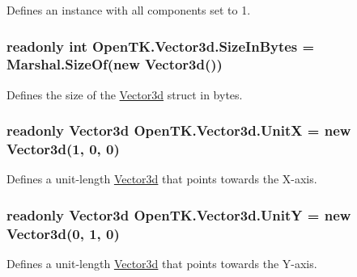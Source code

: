 Defines an instance with all components set to 1. 

\hypertarget{struct_open_t_k_1_1_vector3d_a5390299765c81e1b1f04850ee26c2a5e}{
\subsubsection[{Size\-In\-Bytes}]{\setlength{\rightskip}{0pt plus 5cm}readonly int Open\-T\-K.\-Vector3d.\-Size\-In\-Bytes = Marshal.\-Size\-Of(new {\bf Vector3d}())\hspace{0.3cm}{\ttfamily [static]}}}\label{struct_open_t_k_1_1_vector3d_a5390299765c81e1b1f04850ee26c2a5e}


Defines the size of the \hyperlink{struct_open_t_k_1_1_vector3d}{Vector3d} struct in bytes. 

\hypertarget{struct_open_t_k_1_1_vector3d_a1df7baf64afca7d17602d5f072e188c9}{
\subsubsection[{Unit\-X}]{\setlength{\rightskip}{0pt plus 5cm}readonly {\bf Vector3d} Open\-T\-K.\-Vector3d.\-Unit\-X = new {\bf Vector3d}(1, 0, 0)\hspace{0.3cm}{\ttfamily [static]}}}\label{struct_open_t_k_1_1_vector3d_a1df7baf64afca7d17602d5f072e188c9}


Defines a unit-\/length \hyperlink{struct_open_t_k_1_1_vector3d}{Vector3d} that points towards the X-\/axis. 

\hypertarget{struct_open_t_k_1_1_vector3d_a020b45e3c1a0b417aff18e3deb4a9942}{
\subsubsection[{Unit\-Y}]{\setlength{\rightskip}{0pt plus 5cm}readonly {\bf Vector3d} Open\-T\-K.\-Vector3d.\-Unit\-Y = new {\bf Vector3d}(0, 1, 0)\hspace{0.3cm}{\ttfamily [static]}}}\label{struct_open_t_k_1_1_vector3d_a020b45e3c1a0b417aff18e3deb4a9942}


Defines a unit-\/length \hyperlink{struct_open_t_k_1_1_vector3d}{Vector3d} that points towards the Y-\/axis. 

